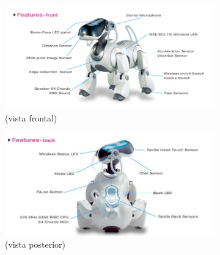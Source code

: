 \documentclass[12pt,a4paper,final,twoside]{article}
\begin{document}
\begin{figure}[H]
	\centering
        \begin{subfigure}[h]{0.5\textwidth}
                \includegraphics[width=\textwidth]{Imatges/ERS-7(front)}
                \caption{(vista frontal)}
        \end{subfigure}%
        \begin{subfigure}[h]{0.5\textwidth}
                \includegraphics[width=\textwidth]{Imatges/ERS-7(back)}
                \caption{(vista posterior)}
        \end{subfigure}
        \begin{subfigure}[bl]{0.5\textwidth}

\end{subfigure}
\end{figure}
\end{document}
